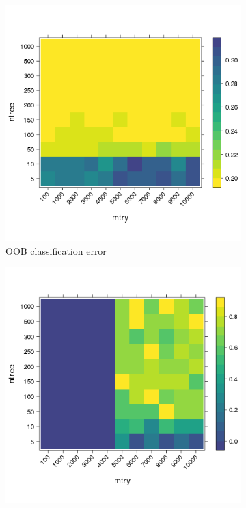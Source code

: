 \documentclass[10pt,letterpaper]{article}
\begin{document}
\begin{figure}[tbhp] 
 \begin{adjustwidth}{-1.00in}{0in}
  \begin{subfigure}[b]{0.5\linewidth}
    \centering
    \includegraphics[totalheight=8cm]{./figs/out-of-bag-prediction-error-prod.png}
    \caption{OOB classification error} 
    \label{fig7:b} 
    \vspace{4ex}
  \end{subfigure} 
  \begin{subfigure}[b]{0.5\linewidth}
    \centering
    \includegraphics[totalheight=8cm]{./figs/rbo-prod.png}

\end{subfigure}
\end{adjustwidth}
\end{figure}
\end{document}
